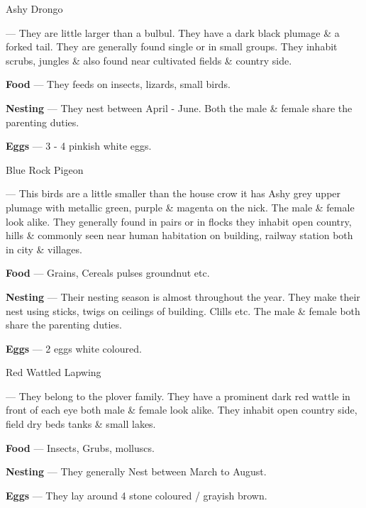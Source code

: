 \begin{bird}{Ashy Drongo}

 --- They are little larger than a bulbul. They have a dark black plumage \& a forked tail. They are generally found single or in small groups. They inhabit scrubs, jungles \& also found near cultivated fields \& country side.

{\large\bf Food} --- They feeds on insects, lizards, small birds.

{\large\bf Nesting} --- They nest between April - June. Both the male \& female share the parenting duties.

{\large\bf Eggs} --- 3 - 4 pinkish white eggs.
\end{bird}

\newpage

\begin{bird}{Blue Rock Pigeon}

 --- This birds are a little smaller than the house crow it has Ashy grey upper plumage with metallic green, purple \& magenta on the nick. The male \& female look alike. They generally found in pairs or in flocks they inhabit open country, hills \& commonly seen near human habitation on building, railway station both in city \& villages.

{\large\bf Food} --- Grains, Cereals pulses groundnut etc.

{\large\bf Nesting} --- Their nesting season is almost throughout the year. They make their nest using sticks, twigs on ceilings of building. Clills etc. The male \& female both share the parenting duties.

{\large\bf Eggs} --- 2 eggs white coloured.
\end{bird}

\begin{bird}{Red Wattled Lapwing}

 --- They belong to the plover family. They have a prominent dark red wattle in front of each eye both male \& female look alike. They inhabit open country side, field dry beds tanks \& small lakes.

{\large\bf Food} --- Insects, Grubs, molluscs.

{\large\bf Nesting} --- They generally Nest between March to August.

{\large\bf Eggs} --- They lay around 4 stone coloured / grayish brown.
\end{bird}

